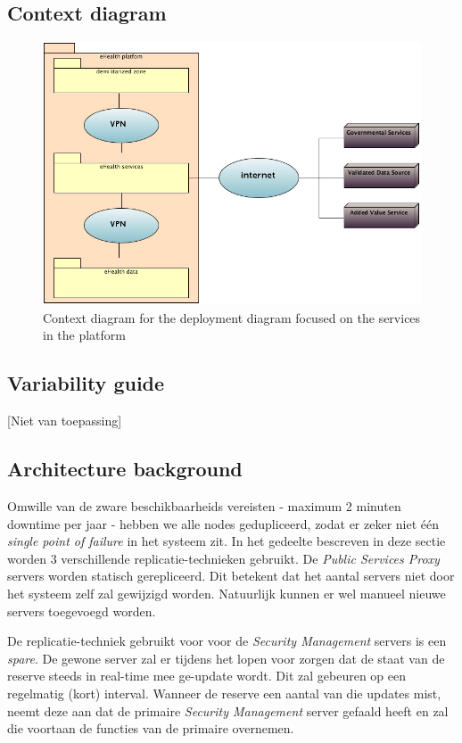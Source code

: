 \documentclass[a4paper,10pt]{article}
\begin{document}
\subsection{Context diagram}
\begin{center}
    \begin{figure}[!h]
      \includegraphics[scale=0.50, width=\textwidth]{../images/deployment_services_context.jpg}
	\caption{Context diagram for the deployment diagram focused on the services in the platform}
    \end{figure}
  \end{center}

\subsection{Variability guide}
[Niet van toepassing]

\subsection{Architecture background}
\label{subsec:arch_back_dep_serv}
Omwille van de zware beschikbaarheids vereisten - maximum 2 minuten downtime per jaar - hebben we alle nodes gedupliceerd, zodat er zeker niet één \textit{single point of failure} in het systeem zit. In het gedeelte bescreven in deze sectie worden 3 verschillende replicatie-technieken gebruikt. De \textit{Public Services Proxy} servers worden statisch gerepliceerd. Dit betekent dat het aantal servers niet door het systeem zelf zal gewijzigd worden. Natuurlijk kunnen er wel manueel nieuwe servers toegevoegd worden.

De replicatie-techniek gebruikt voor voor de \textit{Security Management} servers is een \textit{spare}. De gewone server zal er tijdens het lopen voor zorgen dat de staat van de reserve steeds in real-time mee ge-update wordt. Dit zal gebeuren op een regelmatig (kort) interval. Wanneer de reserve een aantal van die updates mist, neemt deze aan dat de primaire \textit{Security Management} server gefaald heeft en zal die voortaan de functies van de primaire overnemen.
\end{document}
